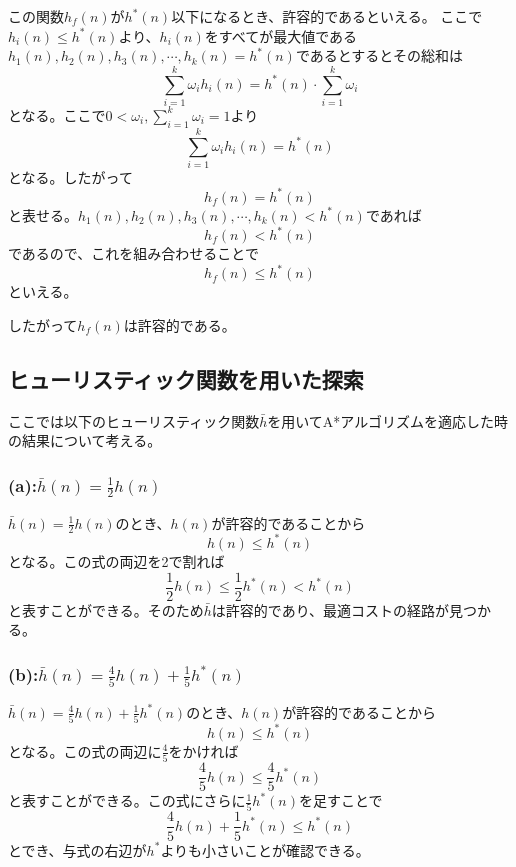 \documentclass[a4paper,11pt,dvipdfmx]{jsarticle}
\begin{document}
この関数$h_f(n)$が$h^*(n)$以下になるとき、許容的であるといえる。
ここで$h_i(n) \leq h^*(n)$より、$h_i(n)$をすべてが最大値である$h_1(n),h_2(n),h_3(n),\cdots,h_k(n) = h^*(n)$であるとするとその総和は
\begin{equation*}
    \sum_{i=1}^{k}\omega_ih_i(n) = h^*(n) \cdot \sum_{i=1}^{k}\omega_i
\end{equation*}
となる。ここで$0<\omega_i,\sum_{i=1}^{k}\omega_i = 1$より
\begin{equation*}
    \sum_{i=1}^{k}\omega_ih_i(n) = h^*(n)
\end{equation*}
となる。したがって
\begin{equation*}
    h_f(n) = h^*(n)
\end{equation*}
と表せる。$h_1(n),h_2(n),h_3(n),\cdots,h_k(n) < h^*(n)$であれば
\begin{equation*}
    h_f(n) < h^*(n)
\end{equation*}
であるので、これを組み合わせることで
\begin{equation*}
    h_f(n) \leq h^*(n)
\end{equation*}
といえる。

したがって$h_f(n)$は許容的である。

\subsection{ヒューリスティック関数を用いた探索}
ここでは以下のヒューリスティック関数$\bar{h}$を用いてA*アルゴリズムを適応した時の結果について考える。
\subsubsection{(a):$\bar{h}(n)=\frac{1}{2}h(n)$}
$\bar{h}(n)=\frac{1}{2}h(n)$のとき、$h(n)$が許容的であることから
\begin{equation*}
    h(n) \leq h^*(n)
\end{equation*}
となる。この式の両辺を2で割れば
\begin{equation*}
    \frac{1}{2} h(n) \leq \frac{1}{2} h^*(n) < h^*(n)
\end{equation*}
と表すことができる。そのため$\bar{h}$は許容的であり、最適コストの経路が見つかる。

\subsubsection{(b):$\bar{h}(n)=\frac{4}{5}h(n) + \frac{1}{5}h^*(n)$}
$\bar{h}(n)=\frac{4}{5}h(n) + \frac{1}{5}h^*(n)$のとき、$h(n)$が許容的であることから
\begin{equation*}
    h(n) \leq h^*(n)
\end{equation*}
となる。この式の両辺に$\frac{4}{5}$をかければ
\begin{equation*}
    \frac{4}{5} h(n) \leq \frac{4}{5} h^*(n) 
\end{equation*}
と表すことができる。この式にさらに$\frac{1}{5}h^*(n)$を足すことで
\begin{equation*}
    \frac{4}{5} h(n) + \frac{1}{5}h^*(n) \leq h^*(n) 
\end{equation*}
とでき、与式の右辺が$h^*$よりも小さいことが確認できる。
\end{document}

